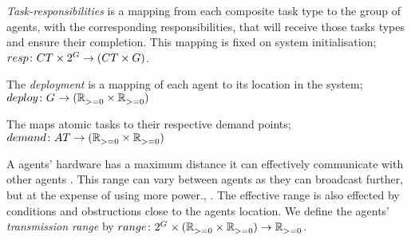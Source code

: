 \newcommand{\formalTaskResponsibilities}[2]{
	\functionFormal{resp}
	{\setCompositeTask{}{} \times \powerSetAgent{}{}{}{}}
	({\setCompositeTask{}{} \times \setAgent{}{}})
}
\newcommand{\functionTaskResponsibilities}[2]{
	\functionSignature{resp}
	{\varCompositeTask{}{}, \setAgent{}{}}
}
\textit{Task-responsibilities} is a mapping from each composite task type to the group of agents, with the corresponding responsibilities, that will receive those tasks types and ensure their completion. This mapping is fixed on system initialisation; $\formalTaskResponsibilities{}{}$.

\newcommand{\formalDeployment}[2]{\functionFormal{deploy}{\setAgents{}{}}{(\setRealNumbersNonNegative{}{} \times \setRealNumbersNonNegative{}{})}}
\newcommand{\functionDeployment}[2]{
	\ifx \\1\\
	\functionSignature{deploy}{\setAgents{}{}}
	\else
	\functionSignature{deploy}{#1}
	\fi
}
The \textit{deployment} is a mapping of each agent to its location in the system; $\formalDeployment{}{}$

\newcommand{\formalTaskDemandPoint}[2]{
	\functionFormal{demand}
	{\setAtomicTask  {}{}}{\tupleLocation{}{}}
}
\newcommand{\functionTaskDemandPoint}[2]{\functionSignature{demand}{\varAtomicTask{}{}}}
The  maps atomic tasks to their respective demand points; $\formalTaskDemandPoint{}{}$ 

\newcommand{\formalTransmissionRange}[2]{
	\functionFormal{range}
	{\powerSetAgents{}{} \times (\setRealNumbersNonNegative{}{} \times \setRealNumbersNonNegative{}{})}
	{\setRealNumbersNonNegative{}{}}
}
\newcommand{\functionTransmissionRange}[2]{\functionSignature{range}{\setAgents{}{}}}

A agents' hardware has a maximum distance it can effectively communicate with other agents \cite{Radman201}. This range can vary between agents as they can broadcast further, but at the expense of using more power., \cite{Padmanabh2008, Song2009}. The effective range is also effected by conditions and obstructions close to the agents location. We define the agents' \textit{transmission range} by $\formalTransmissionRange{}{}$.  
